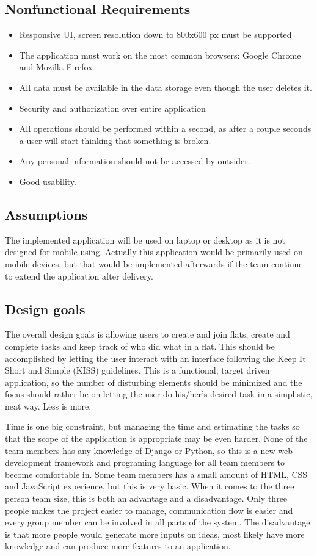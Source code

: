 \documentclass{sig-alt-release2}
\begin{document}
\subsection{Nonfunctional Requirements}
\begin{itemize}
\item Responsive UI, screen resolution down to 800x600 px must be supported
\item The application must work on the most common browsers: Google Chrome and Mozilla Firefox 
\item All data must be available in the data storage even though the user deletes it.
\item Security and authorization over entire application
\item All operations should be performed within a second, as after a couple seconds a user will start thinking that something is broken.
\item Any personal information should not be accessed by outsider.
\item Good usability.
\end{itemize}

\subsection{Assumptions}

The implemented application will be used on laptop or desktop as it is not designed for mobile using. Actually this application would be primarily used on mobile devices, but that would be implemented afterwards if the team continue to extend the application after delivery. 

\subsection{Design goals}

The overall design goals is allowing users to create and join flats, create and
complete tasks and keep track of who did what in a flat. This should be
accomplished by letting the user interact with an interface following the Keep
It Short and Simple (KISS) guidelines. This is a functional, target driven
application, so the number of disturbing elements should be minimized and the
focus should rather be on letting the user do his/her's desired task in a
simplistic, neat way. Less is more.

Time is one big constraint, but managing the time and estimating the tasks so
that the scope of the application is appropriate may be even harder. None of the
team members has any knowledge of Django or Python, so this is a new web
development framework and programing language for all team members to become
comfortable in. Some team members has a small amount of HTML, CSS and JavaScript
experience, but this is very basic. When it comes to the three person team size,
this is both an advantage and a disadvantage. Only three people makes the
project easier to manage, communication flow is easier and every group member
can be involved in all parts of the system. The disadvantage is that more people
would generate more inputs on ideas, most likely have more knowledge and can
produce more features to an application.
\end{document}
